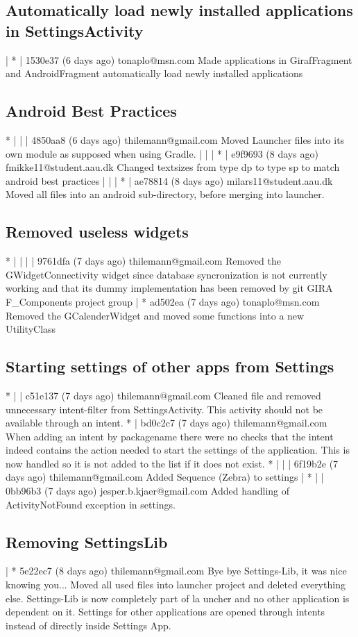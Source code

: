 \subsection{Automatically load newly installed applications in SettingsActivity}
| * | 1530e37 (6 days ago) tonaplo@msn.com Made applications in GirafFragment and AndroidFragment automatically load newly installed applications

\subsection{Android Best Practices}
* | | | 4850aa8 (6 days ago) thilemann@gmail.com Moved Launcher files into its own module as supposed when using Gradle.
| | | * | e9f9693 (8 days ago) fmikke11@student.aau.dk Changed textsizes from type dp to type sp to match android best practices
| | | * | ae78814 (8 days ago) milars11@student.aau.dk Moved all files into an android sub-directory, before merging into launcher.

\subsection{Removed useless widgets}
* | | | | 9761dfa (7 days ago) thilemann@gmail.com Removed the GWidgetConnectivity widget since database syncronization is not currently working and that its dummy implementation has been removed by git GIRA
F\_Components project group
| * ad502ea (7 days ago) tonaplo@msn.com Removed the GCalenderWidget and moved some functions into a new UtilityClass

\subsection{Starting settings of other apps from Settings}
* | | c51e137 (7 days ago) thilemann@gmail.com Cleaned file and removed unnecessary intent-filter from SettingsActivity. This activity should not be available through an intent.
* | bd0c2c7 (7 days ago) thilemann@gmail.com When adding an intent by packagename there were no checks that the intent indeed contains the action needed to start the settings of the application. This is now
handled so it is not added to the list if it does not exist.
* | | | 6f19b2e (7 days ago) thilemann@gmail.com Added Sequence (Zebra) to settings
| * | | 0bb96b3 (7 days ago) jesper.b.kjaer@gmail.com Added handling of ActivityNotFound exception in settings.

\subsection{Removing SettingsLib}
| * 5e22ec7 (8 days ago) thilemann@gmail.com Bye bye Settings-Lib, it was nice knowing you... Moved all used files into launcher project and deleted everything else. Settings-Lib is now completely part of la
uncher and no other application is dependent on it. Settings for other applications are opened through intents instead of directly inside Settings App.

